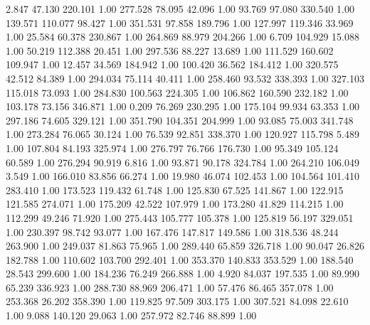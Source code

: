    2.847   47.130  220.101         1.00
 277.528   78.095   42.096         1.00
  93.769   97.080  330.540         1.00
 139.571  110.077   98.427         1.00
 351.531   97.858  189.796         1.00
 127.997  119.346   33.969         1.00
  25.584   60.378  230.867         1.00
 264.869   88.979  204.266         1.00
   6.709  104.929   15.088         1.00
  50.219  112.388   20.451         1.00
 297.536   88.227   13.689         1.00
 111.529  160.602  109.947         1.00
  12.457   34.569  184.942         1.00
 100.420   36.562  184.412         1.00
 320.575   42.512   84.389         1.00
 294.034   75.114   40.411         1.00
 258.460   93.532  338.393         1.00
 327.103  115.018   73.093         1.00
 284.830  100.563  224.305         1.00
 106.862  160.590  232.182         1.00
 103.178   73.156  346.871         1.00
   0.209   76.269  230.295         1.00
 175.104   99.934   63.353         1.00
 297.186   74.605  329.121         1.00
 351.790  104.351  204.999         1.00
  93.085   75.003  341.748         1.00
 273.284   76.065   30.124         1.00
  76.539   92.851  338.370         1.00
 120.927  115.798    5.489         1.00
 107.804   84.193  325.974         1.00
 276.797   76.766  176.730         1.00
  95.349  105.124   60.589         1.00
 276.294   90.919    6.816         1.00
  93.871   90.178  324.784         1.00
 264.210  106.049    3.549         1.00
 166.010   83.856   66.274         1.00
  19.980   46.074  102.453         1.00
 104.564  101.410  283.410         1.00
 173.523  119.432   61.748         1.00
 125.830   67.525  141.867         1.00
 122.915  121.585  274.071         1.00
 175.209   42.522  107.979         1.00
 173.280   41.829  114.215         1.00
 112.299   49.246   71.920         1.00
 275.443  105.777  105.378         1.00
 125.819   56.197  329.051         1.00
 230.397   98.742   93.077         1.00
 167.476  147.817  149.586         1.00
 318.536   48.244  263.900         1.00
 249.037   81.863   75.965         1.00
 289.440   65.859  326.718         1.00
  90.047   26.826  182.788         1.00
 110.602  103.700  292.401         1.00
 353.370  140.833  353.529         1.00
 188.540   28.543  299.600         1.00
 184.236   76.249  266.888         1.00
   4.920   84.037  197.535         1.00
  89.990   65.239  336.923         1.00
 288.730   88.969  206.471         1.00
  57.476   86.465  357.078         1.00
 253.368   26.202  358.390         1.00
 119.825   97.509  303.175         1.00
 307.521   84.098   22.610         1.00
   9.088  140.120   29.063         1.00
 257.972   82.746   88.899         1.00
